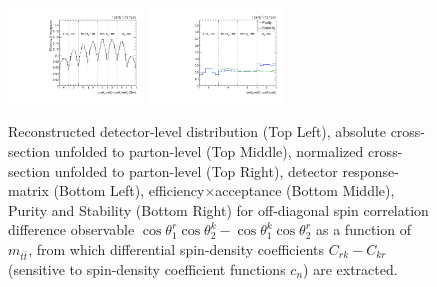 \begin{figure}[htb]
\begin{center}
 \includegraphics[width=0.32\textwidth]{fig_fullRun2UL/unfolding/combined/TotEff_c_Mrk_mttbar.pdf}
 \includegraphics[width=0.32\textwidth]{fig_fullRun2UL/unfolding/combined/PurStab_c_Mrk_mttbar.pdf} \\
\caption{Reconstructed detector-level distribution (Top Left), absolute cross-section unfolded to parton-level (Top Middle), normalized cross-section unfolded to parton-level (Top Right), detector response-matrix (Bottom Left), efficiency$\times$acceptance (Bottom Middle), Purity and Stability (Bottom Right) for off-diagonal spin correlation difference observable $\cos\theta_{1}^{r}\cos\theta_{2}^{k}-\cos\theta_{1}^{k}\cos\theta_{2}^{r}$ as a function of $m_{t\bar{t}}$, from which differential spin-density coefficients $C_{rk}-C_{kr}$ (sensitive to spin-density coefficient functions $c_n$) are extracted.}
\label{fig:c_Mrk_mttbar}
\end{center}
\end{figure}
\clearpage
